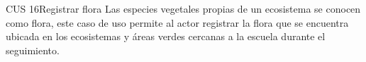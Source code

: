 
\begin{UseCase}{CUS 16}{Registrar flora}
{
    Las especies vegetales propias de un ecosistema se conocen como flora, este caso de uso permite al actor registrar la flora que se encuentra ubicada en los ecosistemas y áreas verdes cercanas a la escuela durante el seguimiento.
}
    
    


\end{UseCase}
